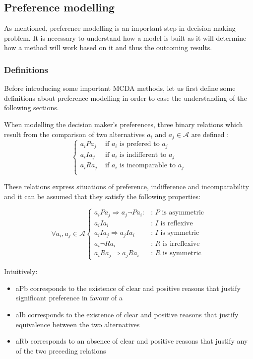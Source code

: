 \subsection{Preference modelling}
\label{sec:prefmod}
As mentioned, preference modelling is an important step in decision making problem. It is necessary to understand how a model is built as it will determine how a method will work based on it and thus the outcoming results.

\subsubsection{Definitions}
Before introducing some important MCDA methods, let us first define some definitions about preference modelling in order to ease the understanding of the following sections.

When modelling the decision maker's preferences, three binary relations which result from the comparison of two alternatives $a_i$ and $a_j \in \mathcal{A}$ are defined \cite{Vin92}:
\begin{equation}
\left\{
\begin{array}{ll}
a_iPa_j & \text{ if $a_i$ is prefered to $a_j$}\\
a_iIa_j & \text{ if $a_i$ is indifferent to $a_j$}\\
a_iRa_j & \text{ if $a_i$ is incomparable to $a_j$}\\
\end{array}
\right.
\end{equation}

These relations express situations of preference, indifference and incomparability and it can be assumed that they satisfy the following properties:

\begin{equation}
\forall a_i, a_j \in \mathcal{A} \left\{
	\begin{array}{ll}
	a_iPa_j \Rightarrow a_j \neg P a_i : & \text{: $P$ is asymmetric}\\
	a_iIa_i & \text{: $I$ is reflexive}\\
	a_iIa_j \Rightarrow a_jIa_i & \text{: $I$ is symmetric}\\
	a_i \neg R a_i & \text{: $R$ is irreflexive}\\
	a_iRa_j \Rightarrow a_jRa_i & \text{: $R$ is symmetric}
	\end{array}
\right.
\end{equation}

Intuitively:
\begin{itemize}
\item aPb corresponds to the existence of clear and positive reasons that justify significant preference in favour of a
\item aIb corresponds to the existence of clear and positive reasons that justify equivalence between the two alternatives
\item aRb corresponds to an absence of clear and positive reasons that justify any of the two preceding relations
\end{itemize}

